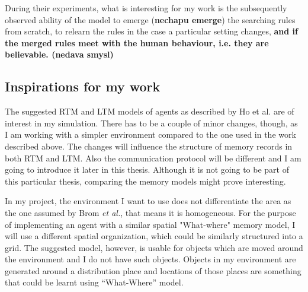 During their experiments, what is interesting for my work is the subsequently observed ability of the model to emerge (\textbf{nechapu emerge}) the searching rules from scratch, to relearn the rules in the case a particular setting changes, \textbf{and if the merged rules meet with the human behaviour, i.e. they are believable. (nedava smysl)}
                 
\subsection{Inspirations for my work}

The suggested RTM and LTM models of agents as described by Ho et al. are of interest in my simulation. \cite{Ho:memoryarchitectures} There has to be a couple of minor changes, though, as I am working with a simpler environment compared to the one used in the work described above. The changes will influence the structure of memory records in both RTM and LTM. Also the communication protocol will be different and I am going to introduce it later in this thesis. Although it is not going to be part of this particular thesis, comparing the memory models might prove interesting.

In my project, the environment I want to use does not differentiate the area as the one assumed by Brom \textit{et al.}, that means it is homogeneous. \cite{Brom:placeandobjects} For the purpose of implementing an agent with a similar spatial "What-where" memory model, I will use a different spatial organization, which could be similarly structured into a grid. The suggested model, however, is usable for objects which are moved around the environment and I do not have such objects. Objects in my environment are generated around a distribution place and locations of those places are something that could be learnt using “What-Where” model. 